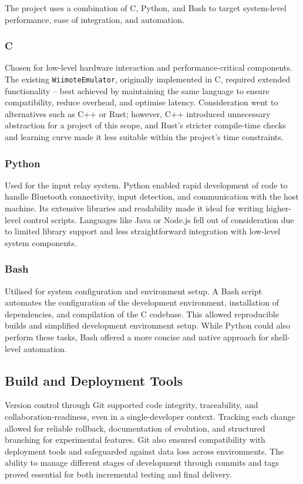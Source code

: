 The project uses a combination of C, Python, and Bash to target system-level performance, ease of integration, and automation.

\subsubsection{C}
Chosen for low-level hardware interaction and performance-critical components. The existing \texttt{WiimoteEmulator}, originally implemented in C, required extended functionality -- best achieved by maintaining the same language to ensure compatibility, reduce overhead, and optimise latency. Consideration went to alternatives such as C++ or Rust; however, C++ introduced unnecessary abstraction for a project of this scope, and Rust's stricter compile-time checks and learning curve made it less suitable within the project's time constraints.

\subsubsection{Python}
Used for the input relay system. Python enabled rapid development of code to handle Bluetooth connectivity, input detection, and communication with the host machine. Its extensive libraries and readability made it ideal for writing higher-level control scripts. Languages like Java or Node.js fell out of consideration due to limited library support and less straightforward integration with low-level system components.

\subsubsection{Bash}
Utilised for system configuration and environment setup. A Bash script automates the configuration of the development environment, installation of dependencies, and compilation of the C codebase. This allowed reproducible builds and simplified development environment setup. While Python could also perform these tasks, Bash offered a more concise and native approach for shell-level automation.

\subsection{Build and Deployment Tools}
Version control through Git supported code integrity, traceability, and collaboration-readiness, even in a single-developer context. Tracking each change allowed for reliable rollback, documentation of evolution, and structured branching for experimental features. Git also ensured compatibility with deployment tools and safeguarded against data loss across environments. The ability to manage different stages of development through commits and tags proved essential for both incremental testing and final delivery.
